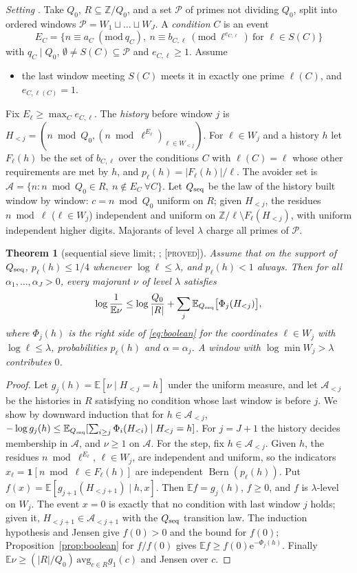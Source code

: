 \documentclass[10pt,reqno]{amsart}
\newtheorem{theorem}{Theorem}[section]
\theoremstyle{definition}
\theoremstyle{remark}
\newcommand{\A}{\mathcal A}
\newcommand{\cP}{\mathcal P}
\newcommand{\E}{\mathbb E}
\newcommand{\Z}{\mathbb Z}
\newcommand{\ind}{\mathbf 1}
\newcommand{\Bern}{\operatorname{Bern}}
\newcommand{\e}{\mathrm e}
\newcommand{\Qseq}{Q_{\rm seq}}
\newcommand{\lab}[1]{\textup{[\textsc{#1}]}}
\begin{document}
\emph{Setting} \cite[\S2.6]{ET}.  Take $Q_0$, $R\subseteq\Z/Q_0$, and a set
$\cP$ of primes not dividing $Q_0$, split into ordered windows
$\cP=W_1\sqcup\dots\sqcup W_J$.  A \emph{condition} $C$ is an event
\[
 E_C=\{n\equiv a_C\ (\mathrm{mod}\ q_C),\ n\equiv b_{C,\ell}\
 (\mathrm{mod}\ \ell^{e_{C,\ell}})\ \text{for }\ell\in S(C)\}
\]
with $q_C\mid Q_0$, $\emptyset\neq S(C)\subseteq\cP$ and $e_{C,\ell}\geq1$.
Assume
\begin{itemize}
\item[(U)] the last window meeting $S(C)$ meets it in exactly one prime
  $\ell(C)$, and $e_{C,\ell(C)}=1$.
\end{itemize}
Fix $E_\ell\geq\max_Ce_{C,\ell}$.  The \emph{history} before window $j$ is
$H_{<j}=(n\bmod Q_0,(n\bmod\ell^{E_\ell})_{\ell\in W_{<j}})$.  For
$\ell\in W_j$ and a history $h$ let $F_\ell(h)$ be the set of $b_{C,\ell}$
over the conditions $C$ with $\ell(C)=\ell$ whose other requirements are
met by $h$, and $p_\ell(h)=|F_\ell(h)|/\ell$.  The avoider set is
$\A=\{n:n\bmod Q_0\in R,\ n\notin E_C\ \forall C\}$.  Let $\Qseq$ be the law
of the history built window by window: $c=n\bmod Q_0$ uniform on $R$;
given $H_{<j}$, the residues $n\bmod\ell$ ($\ell\in W_j$) independent and
uniform on $\Z/\ell\setminus F_\ell(H_{<j})$, with uniform independent
higher digits.  Majorants of level $\lambda$ charge all primes of $\cP$.

\begin{theorem}[sequential sieve limit; {\cite[Thm~2.7]{ET}}; \lab{proved}]\label{thm:seq}
Assume that on the support of $\Qseq$, $p_\ell(h)\leq1/4$ whenever
$\log\ell\leq\lambda$, and $p_\ell(h)<1$ always.  Then for all
$\alpha_1,\dots,\alpha_J>0$, every majorant $\nu$ of level $\lambda$ satisfies
\[
 \log\frac1{\E\nu}\leq\log\frac{Q_0}{|R|}+\sum_j\E_{\Qseq}\bigl[\Phi_j(H_{<j})\bigr],
\]
where $\Phi_j(h)$ is the right side of \eqref{eq:boolean} for the
coordinates $\ell\in W_j$ with $\log\ell\leq\lambda$, probabilities
$p_\ell(h)$ and $\alpha=\alpha_j$.  A window with $\log\min W_j>\lambda$
contributes $0$.
\end{theorem}
\begin{proof}
Let $g_j(h)=\E[\nu\mid H_{<j}=h]$ under the uniform measure, and let
$\A_{<j}$ be the histories in $R$ satisfying no condition whose last
window is before $j$.  We show by downward induction that for
$h\in\A_{<j}$,
$-\log g_j(h)\leq\E_{\Qseq}[\sum_{i\geq j}\Phi_i(H_{<i})\mid H_{<j}=h]$.
For $j=J+1$ the history decides membership in $\A$, and $\nu\geq1$ on
$\A$.  For the step, fix $h\in\A_{<j}$.  Given $h$, the residues
$n\bmod\ell^{E_\ell}$, $\ell\in W_j$, are independent and uniform, so the
indicators $x_\ell=\ind[n\bmod\ell\in F_\ell(h)]$ are independent
$\Bern(p_\ell(h))$.  Put $f(x)=\E[g_{j+1}(H_{<j+1})\mid h,x]$.  Then
$\E f=g_j(h)$, $f\geq0$, and $f$ is $\lambda$-level on $W_j$.  The event
$x=0$ is exactly that no condition with last window $j$ holds; given it,
$H_{<j+1}\in\A_{<j+1}$ with the $\Qseq$ transition law.  The induction
hypothesis and Jensen give $f(0)>0$ and the bound for $f(0)$;
Proposition~\ref{prop:boolean} for $f/f(0)$ gives
$\E f\geq f(0)\e^{-\Phi_j(h)}$.  Finally
$\E\nu\geq(|R|/Q_0)\,\mathrm{avg}_{c\in R}g_1(c)$ and Jensen over $c$.
\end{proof}
\end{document}
